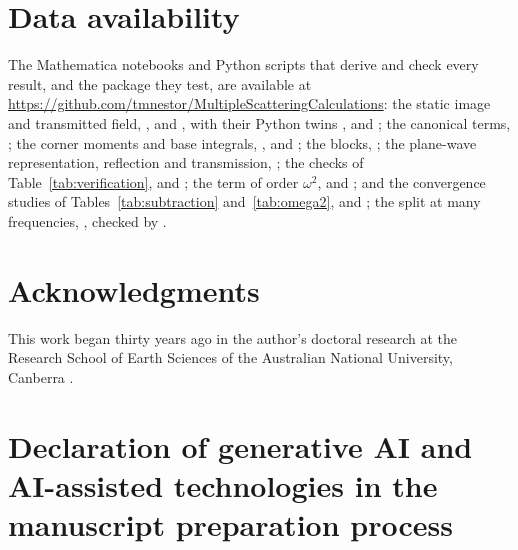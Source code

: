 \documentclass[11pt,a4paper]{article}
\begin{document}
\section*{Data availability}
{\sloppy
The Mathematica notebooks and Python scripts that derive and check every result, and the package they
test, are available at \url{https://github.com/tmnestor/MultipleScatteringCalculations}: the static image and
transmitted field, ,  and
, with their Python twins
,  and
; the canonical terms,
; the corner moments and base integrals,
,  and
; the blocks, ; the
plane-wave representation, reflection and transmission, ;
the checks of Table~\ref{tab:verification},  and
; the term of order $\omega^2$,
 and ; and the convergence
studies of Tables~\ref{tab:subtraction} and~\ref{tab:omega2},
 and
; the split at many frequencies,
, checked by .\par}

\section*{Acknowledgments}
This work began thirty years ago in the author's doctoral research at the Research School of Earth
Sciences of the Australian National University, Canberra \citep{Nestor1996}.

\section*{Declaration of generative AI and AI-assisted technologies in the manuscript preparation process}
\end{document}
